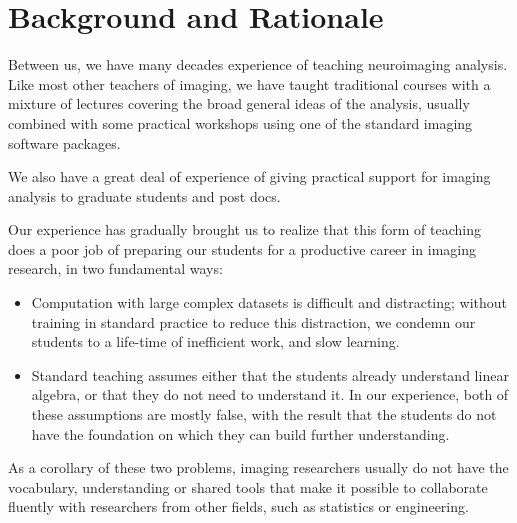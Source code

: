 
\section{Background and Rationale}\label{background}

Between us, we have many decades experience of teaching neuroimaging analysis.
Like most other teachers of imaging, we have taught traditional courses with a
mixture of lectures covering the broad general ideas of the analysis, usually
combined with some practical workshops using one of the standard imaging
software packages.

We also have a great deal of experience of giving practical support for
imaging analysis to graduate students and post docs.

Our experience has gradually brought us to realize that this form of teaching
does a poor job of preparing our students for a productive career in imaging
research, in two fundamental ways:

\begin{itemize}

\item
    Computation with large complex datasets is difficult and distracting;
        without training in standard practice to reduce this distraction, we
        condemn our students to a life-time of inefficient work, and slow
        learning.

\item
    Standard teaching assumes either that the students already understand
        linear algebra, or that they do not need to understand it.  In our
        experience, both of these assumptions are mostly false, with the
        result that the students do not have the foundation on which they can
        build further understanding.

\end{itemize}

As a corollary of these two problems, imaging researchers usually do not have
the vocabulary, understanding or shared tools that make it possible to
collaborate fluently with researchers from other fields, such as statistics or
engineering.


